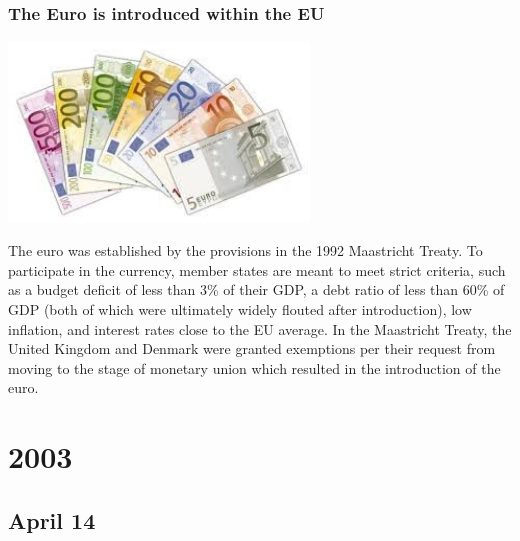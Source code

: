 \documentclass[11pt]{report}
\begin{document}
\subsection{The Euro is introduced within the EU}
\vspace{2mm}\begin{center}\includegraphics[width=8cm]{./img/euro.jpg}\end{center}
The euro was established by the provisions in the 1992 Maastricht Treaty. To participate in the currency, member states are meant to meet strict criteria, such as a budget deficit of less than 3\% of their GDP, a debt ratio of less than 60\% of GDP (both of which were ultimately widely flouted after introduction), low inflation, and interest rates close to the EU average. In the Maastricht Treaty, the United Kingdom and Denmark were granted exemptions per their request from moving to the stage of monetary union which resulted in the introduction of the euro.

\chapter{2003}
\section{April 14}
\end{document}
